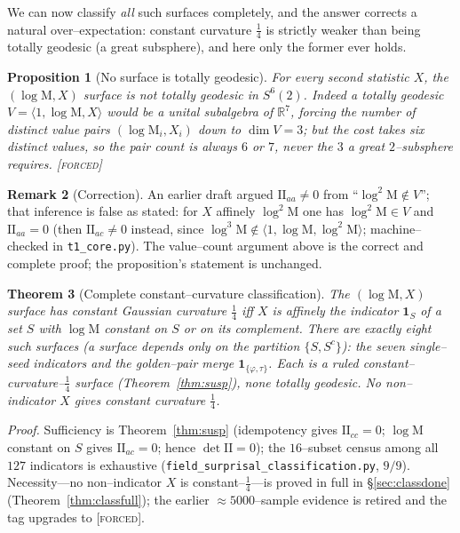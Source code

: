 \documentclass[11pt]{article}
\newtheorem{theorem}{Theorem}[section]
\newtheorem{proposition}[theorem]{Proposition}
\theoremstyle{definition}
\newtheorem{remark}[theorem]{Remark}
\newcommand{\ph}{\varphi}
\newcommand{\R}{\mathbb{R}}
\newcommand{\Mah}{\mathrm{M}}
\newcommand{\forcedtag}{{\scshape [forced]}}
\begin{document}
We can now classify \emph{all} such surfaces completely, and the answer corrects a natural
over--expectation: constant curvature $\tfrac14$ is strictly weaker than being totally geodesic (a great
subsphere), and here only the former ever holds.

\begin{proposition}[No surface is totally geodesic]\label{prop:notTG}
For every second statistic $X$, the $(\log\Mah,X)$ surface is \emph{not} totally geodesic in
$S^{6}(2)$. Indeed a totally geodesic $V=\langle 1,\log\Mah,X\rangle$ would be a unital subalgebra of $\R^7$,
forcing the number of distinct value pairs $(\log\Mah_i,X_i)$ down to $\dim V=3$; but the cost takes
six distinct values, so the pair count is always $6$ or $7$, never the $3$ a great $2$--subsphere
requires. \forcedtag
\end{proposition}

\begin{remark}[Correction]\label{rem:corr}
An earlier draft argued $\mathrm{II}_{aa}\neq0$ from ``$\log^2\Mah\notin V$''; that inference is false
as stated: for $X$ affinely $\log^2\Mah$ one has $\log^2\Mah\in V$ and $\mathrm{II}_{aa}=0$ (then
$\mathrm{II}_{ac}\neq0$ instead, since $\log^3\Mah\notin\langle1,\log\Mah,\log^2\Mah\rangle$;
machine--checked in \texttt{t1\_core.py}). The value--count argument above is the correct and complete
proof; the proposition's statement is unchanged.
\end{remark}

\begin{theorem}[Complete constant--curvature classification]\label{thm:classification}
The $(\log\Mah,X)$ surface has constant Gaussian curvature $\tfrac14$ iff $X$ is affinely the indicator
$\mathbf 1_S$ of a set $S$ with $\log\Mah$ constant on $S$ or on its complement. There are
\emph{exactly eight} such surfaces (a surface depends only on the partition $\{S,S^c\}$): the seven
single--seed indicators and the golden--pair merge $\mathbf 1_{\{\ph,\tau\}}$. Each is a ruled
constant--curvature--$\tfrac14$ surface (Theorem~\ref{thm:susp}), none totally geodesic. No
\emph{non}--indicator $X$ gives constant curvature $\tfrac14$.
\end{theorem}
\noindent\emph{Proof.} Sufficiency is Theorem~\ref{thm:susp} (idempotency gives
$\mathrm{II}_{cc}=0$; $\log\Mah$ constant on $S$ gives $\mathrm{II}_{ac}=0$; hence $\det\mathrm{II}=0$);
the $16$--subset census among all $127$ indicators is exhaustive (\texttt{field\_surprisal\_classification.py},
$9/9$). Necessity---no non--indicator $X$ is constant--$\tfrac14$---is proved in full in
\S\ref{sec:classdone} (Theorem~\ref{thm:classfull}); the earlier $\approx5000$--sample evidence is
retired and the tag upgrades to \forcedtag.
\end{document}
